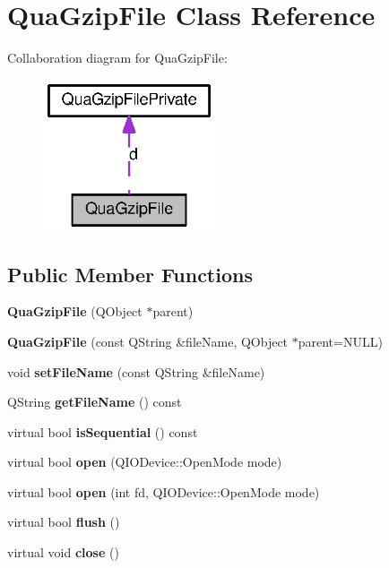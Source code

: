\section{QuaGzipFile Class Reference}
\label{classQuaGzipFile}


Collaboration diagram for QuaGzipFile:
\nopagebreak
\begin{figure}[H]
\begin{center}
\leavevmode
\includegraphics[width=144pt]{classQuaGzipFile__coll__graph}
\end{center}
\end{figure}
\subsection*{Public Member Functions}
\begin{DoxyCompactItemize}
\item 
{\bfseries QuaGzipFile} (QObject $\ast$parent)\label{classQuaGzipFile_a13996f5db660c4a29645f8d208b9ca6b}

\item 
{\bfseries QuaGzipFile} (const QString \&fileName, QObject $\ast$parent=NULL)\label{classQuaGzipFile_ac7f7703bda9c6169c001aa15641bb2ea}

\item 
void {\bfseries setFileName} (const QString \&fileName)\label{classQuaGzipFile_a253fbaf410a3d4ae0a719505c5525149}

\item 
QString {\bfseries getFileName} () const \label{classQuaGzipFile_a9a0954a1db1fcf2aeba0530239bce71c}

\item 
virtual bool {\bfseries isSequential} () const \label{classQuaGzipFile_ae97f4e15d86c965c156df33d00318176}

\item 
virtual bool {\bfseries open} (QIODevice::OpenMode mode)\label{classQuaGzipFile_a1d560babdfff3a3441d704099a5bc1e4}

\item 
virtual bool {\bfseries open} (int fd, QIODevice::OpenMode mode)\label{classQuaGzipFile_adf5a954bb9bfda2d33cd336a213e2549}

\item 
virtual bool {\bfseries flush} ()\label{classQuaGzipFile_ab745f345b727c81abbc3eb5af4dca844}

\item 
virtual void {\bfseries close} ()\label{classQuaGzipFile_a273205350b1235a242a1eb5cbf586434}

\end{DoxyCompactItemize}
